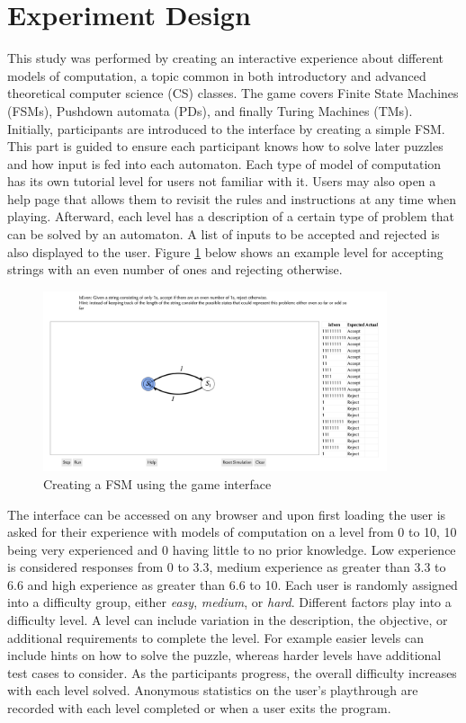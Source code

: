 \documentclass[letterpaper,man,natbib,floatsintext]{apa7}  %
\begin{document}
\section{Experiment Design}
This study was performed by creating an interactive experience about different models of computation, a topic common in 
both introductory and advanced theoretical computer science (CS) classes. The game covers Finite State Machines (FSMs), Pushdown automata (PDs),
and finally Turing Machines (TMs). Initially, participants are introduced to the interface by creating a simple FSM. This part is guided to ensure each participant knows how to solve later puzzles and how input is fed into each automaton. Each type of model of computation has its own tutorial level for users not familiar with it. Users may also open a help page
that allows them to revisit the rules and instructions at any time when playing.
Afterward, each level has a description of a certain type of problem that can be solved by an automaton. A list of inputs 
to be accepted and rejected is also displayed to the user. Figure \ref{fig:interface} below shows an example level for accepting strings with an even number of ones and rejecting otherwise. 
\begin{figure}[h!]
	\centering
	\includegraphics[width=0.9\textwidth]{example_interface_1}
	\caption{Creating a FSM using the game interface}
	\label{fig:interface}
\end{figure}
The interface can be accessed on any browser and upon first loading the user is asked for their experience with models of computation on a level from 0 to 10, 10 being very experienced and 0 having little to no prior knowledge. 
Low experience is considered responses from 0 to 3.3, medium experience as greater than 3.3 to 6.6 and high experience as greater than 6.6 to 10.
Each user is
randomly assigned into a difficulty group, either {\it easy}, {\it medium}, or {\it hard}. Different factors play into a difficulty level. A level can include variation in the description, the objective, or additional requirements to complete
the level. For example easier levels can include hints on how to solve the puzzle, whereas harder levels have additional test cases to consider. As the participants progress, the overall difficulty increases with each level solved. Anonymous
statistics on the user's playthrough are recorded with each level completed or when a user exits the program.
\end{document}
